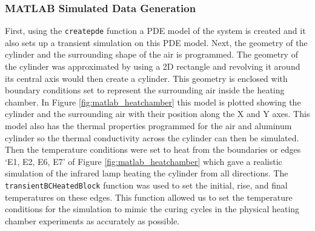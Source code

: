 \subsubsection{MATLAB Simulated Data Generation}
First, using the \lstinline{createpde} function a PDE model of the system is created and it also sets up a transient simulation on this PDE model. Next, the geometry of the cylinder and the surrounding shape of the air is programmed. The geometry of the cylinder was approximated by using a 2D rectangle and revolving it around its central axis would then create a cylinder. This geometry is enclosed with boundary conditions set to represent the surrounding air inside the heating chamber. In Figure \ref{fig:matlab_heatchamber} this model is plotted showing the cylinder and the surrounding air with their position along the X and Y axes. This model also has the thermal properties programmed for the air and aluminum cylinder so the thermal conductivity across the cylinder can then be simulated. Then the temperature conditions were set to heat from the boundaries or edges ‘E1, E2, E6, E7’ of Figure \ref{fig:matlab_heatchamber} which gave a realistic simulation of the infrared lamp heating the cylinder from all directions. The \lstinline{transientBCHeatedBlock} function was used to set the initial, rise, and final temperatures on these edges. This function allowed us to set the temperature conditions for the simulation to mimic the curing cycles in the physical heating chamber experiments as accurately as possible.
